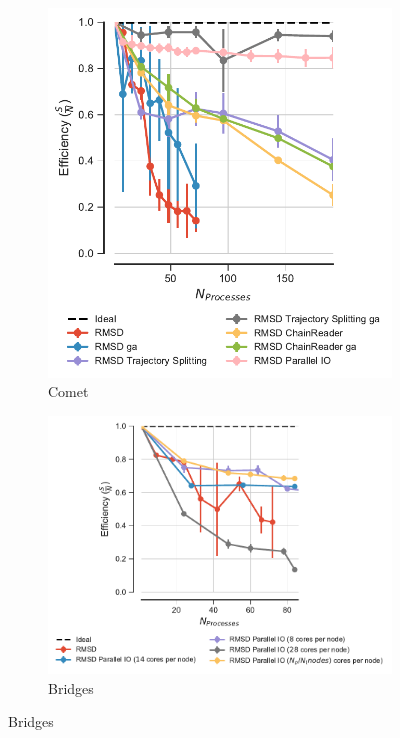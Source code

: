 \begin{figure}[ht!]
\centering
\begin{subfigure}{.4\textwidth}
  \includegraphics[width=\linewidth]{figures/Comparison_Efficiency_all.pdf}
  \caption{Comet}
  \label{fig:comparison_efficiency}
\end{subfigure}
\hfill
\begin{subfigure}{.5\textwidth}
  \includegraphics[width=\linewidth]{figures/Comparison_Efficiency_all_Bridges.pdf}
  \caption{Bridges}
  \label{fig:comparison_efficiency_Bridges}
\end{subfigure}


\end{figure}
